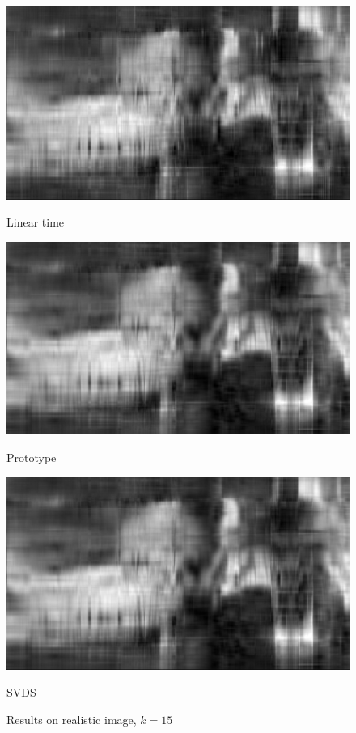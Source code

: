 \documentclass{article}
\begin{document}
\begin{figure}[p]
	\begin{minipage}{0.33\linewidth}
		\centering
		\includegraphics[width=1\linewidth]{./fig/image_rec21.jpeg}
		\caption{Linear time}
	\end{minipage}
	\begin{minipage}{0.33\linewidth}
		\centering
		\includegraphics[width=1\linewidth]{./fig/image_rec22.jpeg}
		\caption{Prototype}
	\end{minipage}
    \begin{minipage}{0.33\linewidth}
		\centering
		\includegraphics[width=1\linewidth]{./fig/image_rec23.jpeg}
		\caption{SVDS }
	\end{minipage}
	\caption*{Results on realistic image, $k=15$}
\end{figure} 
\end{document}
